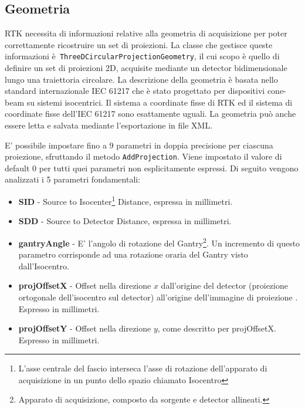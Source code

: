 \documentclass[a4paper,12pt, doubleside]{report}
\begin{document}
            \subsection{Geometria}
                \par
                    RTK necessita di informazioni relative alla geometria di acquisizione per poter correttamente ricostruire un set di proiezioni. La classe che gestisce queste informazioni è\texttt{ ThreeDCircularProjectionGeometry}, il cui scopo è quello di definire un set di proiezioni 2D, acquisite mediante un detector bidimensionale lungo una traiettoria circolare. La descrizione della geometria è basata nello standard internazionale IEC 61217 che è stato progettato per dispositivi cone-beam su sistemi isocentrici. Il sistema a coordinate fisse di RTK ed il sistema di coordinate fisse dell'IEC 61217 sono esattamente uguali. La geometria può anche essere letta e salvata mediante l'esportazione in file XML.
                
                \bigskip
                \par
                    E' possibile impostare fino a 9 parametri in doppia precisione per ciascuna proiezione, sfruttando il metodo \texttt{AddProjection}. Viene impostato il valore di default $0$ per tutti quei parametri non esplicitamente espressi. Di seguito vengono analizzati i 5 parametri fondamentali:
                        
                    \begin{itemize}
                        \item \textbf{SID} - Source to Isocenter\footnote{L’asse centrale del fascio interseca l’asse di rotazione dell'apparato di acquisizione in un punto dello spazio chiamato Isocentro} Distance, espressa in millimetri.
                        \item \textbf{SDD} - Source to Detector Distance, espressa in millimetri.
                        \item \textbf{gantryAngle} - E' l'angolo di rotazione del Gantry\footnote{Apparato di acquisizione, composto da sorgente e detector allineati.}. Un incremento di questo parametro corrisponde ad una rotazione oraria del Gantry visto dall'Isocentro.
                        \item \textbf{projOffsetX} - Offset nella direzione $x$ dall'origine del detector (proiezione ortogonale dell'isocentro sul detector) all'origine dell'immagine di proiezione \cite{rtk-users-proj-offset}. Espresso in millimetri. 
                        \item \textbf{projOffsetY} - Offset nella direzione $y$, come descritto per projOffsetX. Espresso in millimetri.
                    \end{itemize}
                    
\end{document}
